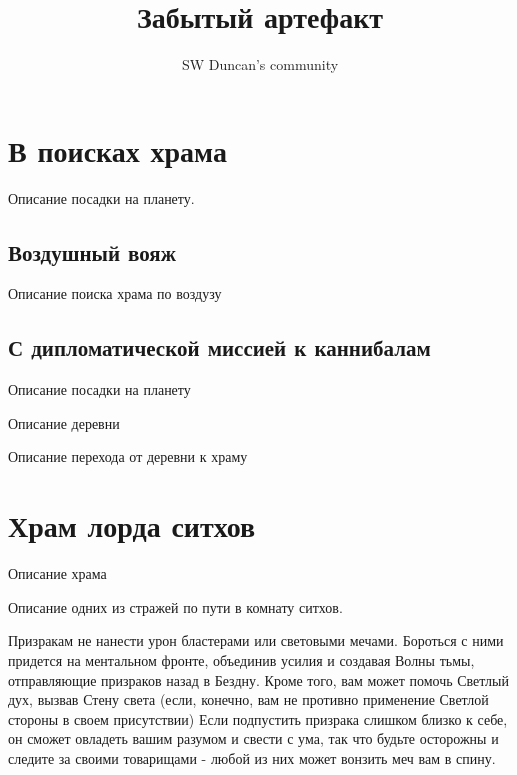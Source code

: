 \documentclass{article}
\title{Забытый артефакт}
\author{SW Duncan's community}
\begin{document}
\pagecolor{sky_black}
\BgThispage
\maketitle %
\newpage
\tableofcontents %
\newpage
\section{В поисках храма}

Описание посадки на планету.
\begin{myquote}
\color{sw}

\end{myquote}
\subsection{Воздушный вояж}
Описание поиска храма по воздузу
\begin{myquote}
\color{sw}

\end{myquote}


\begin{myquote}
\color{sw}

\end{myquote}
\subsection{С дипломатической миссией к каннибалам}
Описание посадки на планету
\begin{myquote}
\color{sw}

\end{myquote}
Описание деревни
\begin{myquote}
\color{sw}

\end{myquote}
Описание перехода от деревни к храму
\begin{myquote}
\color{sw}

\end{myquote}

\section{Храм лорда ситхов}
Описание храма
\begin{myquote}
\color{sw}

\end{myquote}

Описание одних из стражей по пути в комнату ситхов.
\begin{myquote}
\color{sw}

\end{myquote}
Призракам не нанести урон бластерами или световыми мечами.
Бороться с ними придется на ментальном фронте, объединив усилия и создавая Волны тьмы, отправляющие призраков назад в Бездну.
Кроме того, вам может помочь Светлый дух, вызвав Стену света (если, конечно, вам не противно применение Светлой стороны в своем присутствии)
Если подпустить призрака слишком близко к себе, он сможет овладеть вашим разумом и свести с ума, так что будьте осторожны и следите за своими товарищами - любой из них может вонзить меч вам в спину.
\end{document}
